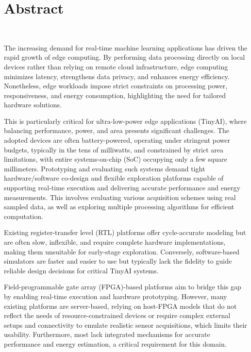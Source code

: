 \cleardoublepage
\chapter*{Abstract}
~\newline~\newline~
\thispagestyle{plain}

\setlength{\parskip}{1em}

    The increasing demand for real-time machine learning applications has driven the rapid growth of edge computing. By performing data processing directly on local devices rather than relying on remote cloud infrastructure, edge computing minimizes latency, strengthens data privacy, and enhances energy efficiency. Nonetheless, edge workloads impose strict constraints on processing power, responsiveness, and energy consumption, highlighting the need for tailored hardware solutions.
    
    This is particularly critical for ultra-low-power edge applications (\mbox{TinyAI}), where balancing performance, power, and area presents significant challenges. The adopted devices are often battery-powered, operating under stringent power budgets, typically in the tens of milliwatts, and constrained by strict area limitations, with entire systems-on-chip (SoC) occupying only a few square millimeters. Prototyping and evaluating such systems demand tight hardware/software co-design and flexible exploration platforms capable of supporting real-time execution and delivering accurate performance and energy measurements. This involves evaluating various acquisition schemes using real sampled data, as well as exploring multiple processing algorithms for efficient computation. 
    
    Existing register-transfer level (RTL) platforms offer cycle-accurate modeling but are often slow, inflexible, and require complete hardware implementations, making them unsuitable for early-stage exploration. Conversely, software-based simulators are faster and easier to use but typically lack the fidelity to guide reliable design decisions for critical \mbox{TinyAI} systems.
    
    Field-programmable gate array (FPGA)-based platforms aim to bridge this gap by enabling real-time execution and hardware prototyping. However, many existing platforms are server-based, relying on host-FPGA models that do not reflect the needs of resource-constrained devices or require complex external setups and connectivity to emulate realistic sensor acquisitions, which limits their usability. Furthermore, most lack integrated mechanisms for accurate performance and energy estimation, a critical requirement for this domain.

